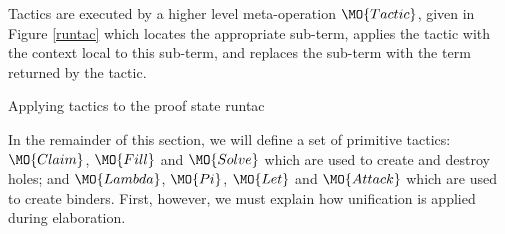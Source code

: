 Tactics are executed by a higher level meta-operation $\MO{Tactic}$, 
given in Figure \ref{runtac} which
locates the appropriate sub-term, applies the tactic with the context
local to this sub-term, and
replaces the sub-term with the term returned by the
tactic. 

{Applying tactics to the proof state}
{runtac}

In the remainder of this section, we will define a set of primitive tactics:
$\MO{Claim}$, $\MO{Fill}$ and $\MO{Solve}$ which are used to create and destroy
holes; and $\MO{Lambda}$, $\MO{Pi}$, $\MO{Let}$ and $\MO{Attack}$ which are
used to create binders. First, however, we must explain how unification is
applied during elaboration.

